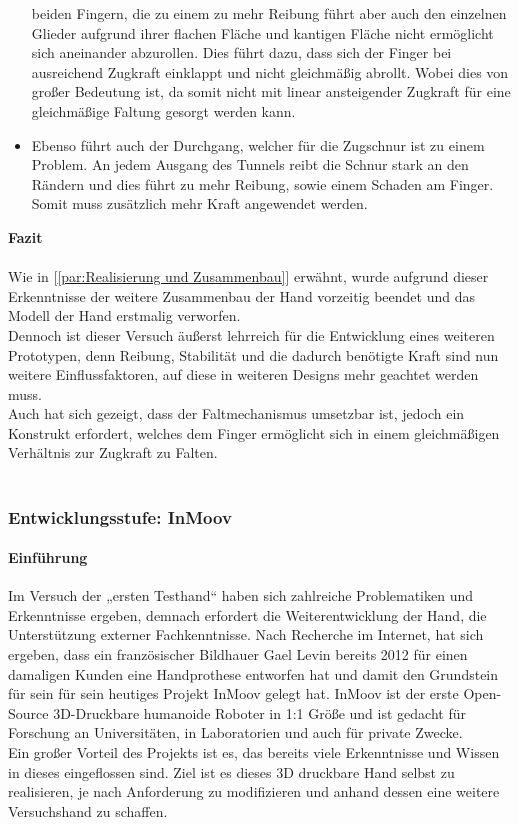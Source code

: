 \documentclass[titlepage,12pt,twoside]{article}
\begin{document}
\begin{itemize}
	beiden Fingern, die zu einem zu mehr Reibung führt aber auch den einzelnen 
	Glieder aufgrund ihrer flachen Fläche und kantigen Fläche nicht ermöglicht 
	sich aneinander abzurollen. Dies führt dazu, dass sich der Finger bei ausreichend 
	Zugkraft einklappt und nicht gleichmäßig abrollt. Wobei dies von großer 
	Bedeutung ist, da somit nicht mit linear ansteigender Zugkraft für eine 
	gleichmäßige Faltung gesorgt werden kann.
	\item Ebenso führt auch der Durchgang, welcher für die Zugschnur ist zu 
	einem Problem. An jedem Ausgang des Tunnels reibt die Schnur stark an den 
	Rändern und dies führt zu mehr Reibung, sowie einem Schaden am Finger.
	Somit muss zusätzlich mehr Kraft angewendet werden.
\end{itemize}
\hfill \break

\textbf{Fazit} \\
\\
Wie in [\textcolor{blue}{\autoref{par:Realisierung und Zusammenbau}}] erwähnt, wurde aufgrund 
dieser Erkenntnisse der weitere Zusammenbau der Hand vorzeitig beendet und das 
Modell der Hand erstmalig verworfen. \\
Dennoch ist dieser Versuch äußerst lehrreich für die Entwicklung eines weiteren 
Prototypen, denn Reibung, Stabilität und die dadurch benötigte Kraft sind nun 
weitere Einflussfaktoren, auf diese in weiteren Designs mehr geachtet werden 
muss. \\
Auch hat sich gezeigt, dass der Faltmechanismus umsetzbar ist, jedoch ein Konstrukt 
erfordert, welches dem Finger ermöglicht sich in einem gleichmäßigen Verhältnis 
zur Zugkraft zu Falten. \\
\\

\subsubsection{Entwicklungsstufe: InMoov}
\label{chap:Entwicklungsstufe: InMoov}
\paragraph{Einführung}
\hfill \break
\hfill \break
Im Versuch der „ersten Testhand“ haben sich zahlreiche Problematiken und 
Erkenntnisse ergeben, demnach erfordert die Weiterentwicklung der Hand, 
die Unterstützung externer Fachkenntnisse.
Nach Recherche im Internet, hat sich ergeben, dass ein französischer 
Bildhauer Gael Levin bereits 2012 für einen damaligen Kunden eine Handprothese 
entworfen hat und damit den Grundstein für sein für sein heutiges Projekt 
InMoov gelegt hat. InMoov ist der erste Open-Source 3D-Druckbare humanoide 
Roboter in 1:1 Größe und ist gedacht für Forschung an Universitäten, in 
Laboratorien und auch für private Zwecke. \\
Ein großer Vorteil des Projekts ist es, das bereits viele Erkenntnisse und 
Wissen in dieses eingeflossen sind. Ziel ist es dieses 3D druckbare Hand 
selbst zu realisieren, je nach Anforderung zu modifizieren und anhand dessen 
eine weitere Versuchshand zu schaffen. \\
\\
\end{document}
